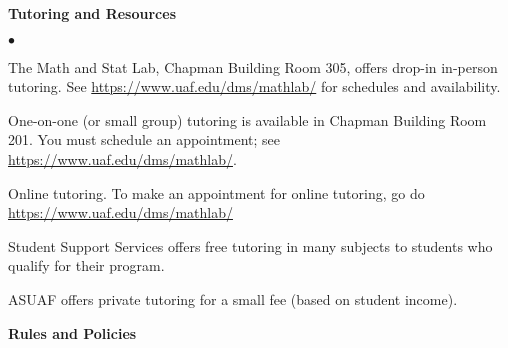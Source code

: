 \documentclass[12pt]{article}
\renewcommand{\emph}[1]{\textsf{\textbf{#1}}}
\newcommand{\localhead}[1]{\par\smallskip\textbf{#1}\nobreak\\}%
\def\heading#1{\localhead{\large\emph{#1}}}
\def\subheading#1{\localhead{\emph{#1}}}
\newenvironment{clist}%
{\bgroup\parskip 0pt\begin{list}{$\bullet$}{\partopsep 4pt\topsep 0pt\itemsep -2pt}}%
{\end{list}\egroup}%
\begin{document}
\heading{Tutoring and Resources}
\vskip -30pt\strut
\begin{clist}
	\item The Math and Stat Lab, Chapman Building Room 305, offers drop-in in-person tutoring. 
	See \url{https://www.uaf.edu/dms/mathlab/} for schedules and availability.
	\item One-on-one (or small group) tutoring is available in 
Chapman Building Room 201. You must schedule an
appointment; see \url{https://www.uaf.edu/dms/mathlab/}.
	\item Online tutoring. To make an appointment for online tutoring, go do \url{https://www.uaf.edu/dms/mathlab/}
		\item Student Support Services offers free tutoring in many subjects to students who qualify for their program.
	\item ASUAF offers private tutoring for a small fee (based on student income).
\end{clist}

\heading{Rules and Policies}
\vskip -20pt


\end{document}
